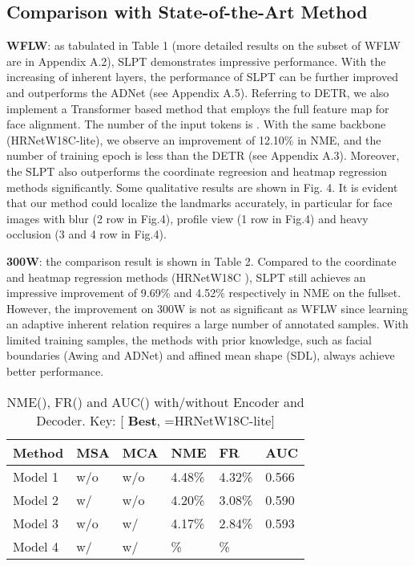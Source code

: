 \documentclass[10pt,twocolumn,letterpaper]{article}
\begin{document}
\subsection{Comparison with State-of-the-Art Method}
\textbf{WFLW}: as tabulated in Table 1 (more detailed results on the subset of WFLW are in Appendix A.2), SLPT demonstrates impressive performance. With the increasing of inherent layers, the performance of SLPT can be further improved and outperforms the ADNet (see Appendix A.5). Referring to DETR, we also implement a Transformer based method that employs the full feature map for face alignment. The number of the input tokens is . With the same backbone (HRNetW18C-lite), we observe an improvement of 12.10\% in NME, and the number of training epoch is  less than the DETR (see Appendix A.3). Moreover, the SLPT also outperforms the coordinate regreesion and heatmap regression methods significantly. Some qualitative results are shown in Fig. 4. It is evident that our method could localize the landmarks accurately, in particular for face images with blur (2 row in Fig.4), profile view (1 row in Fig.4) and heavy occlusion (3 and 4 row in Fig.4).

\textbf{300W}: the comparison result is shown in Table 2. Compared to the coordinate and heatmap regression methods (HRNetW18C \cite{HRnet}), SLPT still achieves an impressive improvement of 9.69\% and 4.52\% respectively in NME on the fullset. However, the improvement on 300W is not as significant as WFLW since learning an adaptive inherent relation requires a large number of annotated samples. With limited training samples, the methods with prior knowledge, such as facial boundaries (Awing and ADNet) and affined mean shape (SDL), always achieve better performance.

\begin{table}[t!]
	\centering
	\begin{tabular}{|m{1.4cm}<{\centering}|m{0.85cm}<{\centering}|m{0.85cm}<{\centering}|m{0.85cm}<{\centering}|m{0.85cm}<{\centering}|m{0.85cm}<{\centering}|}
		\hline
		Method & MSA & MCA & NME & FR & AUC \\ \hline
		Model 1 &  w/o  & w/o  & 4.48\% & 4.32\% & 0.566 \\ \hline
		Model 2 & w/ & w/o & 4.20\%  & 3.08\% & 0.590 \\ \hline
		Model 3 & w/o & w/ & 4.17\% & 2.84\% & 0.593 \\ \hline
		Model 4 & w/ & w/ & {\color{red} }\% & {\color{red} }\% & {\color{red} } \\ \hline
	\end{tabular}
	\caption{NME(), FR() and AUC() with/without Encoder and Decoder. Key: [{\color{red} \textbf{Best}}, =HRNetW18C-lite]}
	\label{Tabal6}
\end{table}
\end{document}
